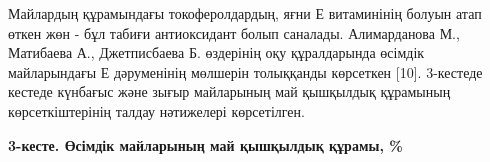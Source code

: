 \begin{multicols}{2}
Майлардың құрамындағы токоферолдардың, яғни Е витаминінің болуын атап
өткен жөн - бұл табиғи антиоксидант болып саналады. Алимарданова М.,
Матибаева А., Джетписбаева Б. өздерінің оқу құралдарында өсімдік
майларындағы Е дәруменінің мөлшерін толыққанды көрсеткен {[}10{]}.
3-кестеде кестеде күнбағыс және зығыр майларының май қышқылдық құрамының
көрсеткіштерінің талдау нәтижелері көрсетілген.
\end{multicols}

{\bfseries 3-кесте. Өсімдік майларының май қышқылдық құрамы, \%}


